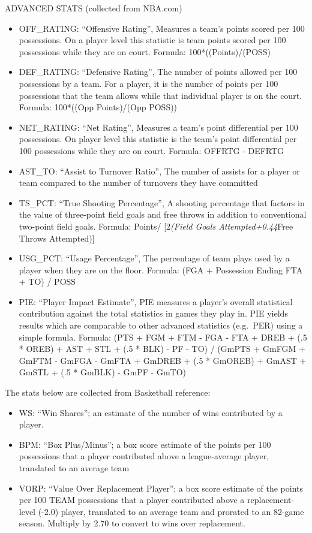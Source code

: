 \documentclass[
]{article}
\providecommand{\tightlist}{%
  \setlength{\itemsep}{0pt}\setlength{\parskip}{0pt}}
\begin{document}
ADVANCED STATS (collected from NBA.com)

\begin{itemize}
\tightlist
\item
  OFF\_RATING: ``Offensive Rating'', Measures a team's points scored per
  100 possessions. On a player level this statistic is team points
  scored per 100 possessions while they are on court. Formula:
  100*((Points)/(POSS)
\item
  DEF\_RATING: ``Defensive Rating'', The number of points allowed per
  100 possessions by a team. For a player, it is the number of points
  per 100 possessions that the team allows while that individual player
  is on the court. Formula: 100*((Opp Points)/(Opp POSS))
\item
  NET\_RATING: ``Net Rating'', Measures a team's point differential per
  100 possessions. On player level this statistic is the team's point
  differential per 100 possessions while they are on court. Formula:
  OFFRTG - DEFRTG
\item
  AST\_TO: ``Assist to Turnover Ratio'', The number of assists for a
  player or team compared to the number of turnovers they have committed
\item
  TS\_PCT: ``True Shooting Percentage'', A shooting percentage that
  factors in the value of three-point field goals and free throws in
  addition to conventional two-point field goals. Formula: Points/
  {[}2\emph{(Field Goals Attempted+0.44}Free Throws Attempted){]}
\item
  USG\_PCT: ``Usage Percentage'', The percentage of team plays used by a
  player when they are on the floor. Formula: (FGA + Possession Ending
  FTA + TO) / POSS
\item
  PIE: ``Player Impact Estimate'', PIE measures a player's overall
  statistical contribution against the total statistics in games they
  play in. PIE yields results which are comparable to other advanced
  statistics (e.g.~PER) using a simple formula. Formula: (PTS + FGM +
  FTM - FGA - FTA + DREB + (.5 * OREB) + AST + STL + (.5 * BLK) - PF -
  TO) / (GmPTS + GmFGM + GmFTM - GmFGA - GmFTA + GmDREB + (.5 * GmOREB)
  + GmAST + GmSTL + (.5 * GmBLK) - GmPF - GmTO)
\end{itemize}

The stats below are collected from Basketball reference:

\begin{itemize}
\tightlist
\item
  WS: ``Win Shares''; an estimate of the number of wins contributed by a
  player.
\item
  BPM: ``Box Plus/Minus''; a box score estimate of the points per 100
  possessions that a player contributed above a league-average player,
  translated to an average team
\item
  VORP: ``Value Over Replacement Player''; a box score estimate of the
  points per 100 TEAM possessions that a player contributed above a
  replacement-level (-2.0) player, translated to an average team and
  prorated to an 82-game season. Multiply by 2.70 to convert to wins
  over replacement.
\end{itemize}
\end{document}
